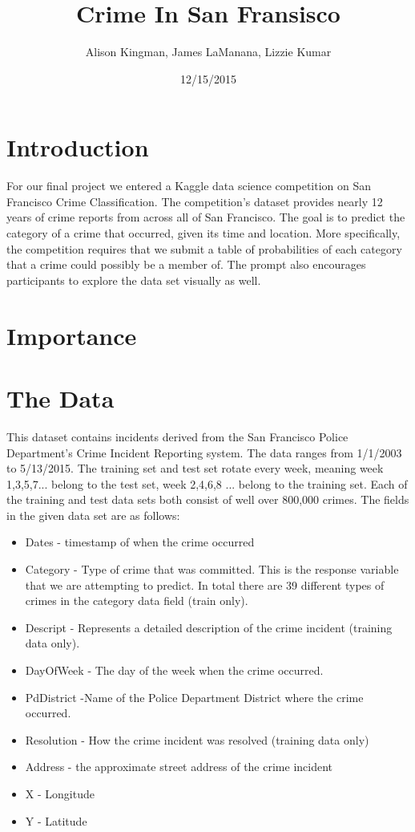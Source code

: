 \documentclass[11pt]{article}
\title{Crime In San Fransisco}
\author{Alison Kingman, James LaManana, Lizzie Kumar}
\date{12/15/2015}
\begin{document}


\maketitle

\section*{Introduction}

For our final project we entered a Kaggle data science competition on San Francisco Crime Classification. The competition's dataset provides nearly 12 years of crime reports from across all of San Francisco. The goal is to predict the category of a crime that occurred, given its time and location. More specifically, the competition requires that we submit a table of probabilities of each category that a crime could possibly be a member of.  The prompt also encourages participants to explore the data set visually as well.	
 
\section*{Importance}

 

\section*{The Data}

This dataset contains incidents derived from the San Francisco Police Department's Crime Incident Reporting system. The data ranges from 1/1/2003 to 5/13/2015. The training set and test set rotate every week, meaning week 1,3,5,7... belong to the test set, week 2,4,6,8 ... belong to the training set.  Each of the training and test data sets both consist of well over 800,000 crimes. The fields in the given data set are as follows: 
 
 
\begin{itemize}
\item Dates -  timestamp of when the crime occurred
\item Category - Type of crime that was committed. This is the response variable that we are attempting to predict. In total there are 39 different types of crimes in the category data field (train only).
\item Descript - Represents a detailed description of the crime incident (training data only).
\item DayOfWeek  - The day of the week when the crime occurred.
\item PdDistrict -Name of the Police Department District where the crime occurred.
\item Resolution - How the crime incident was resolved (training data only)
\item Address - the approximate street address of the crime incident 
\item X - Longitude
\item Y - Latitude
\end{itemize}
\end{document}
